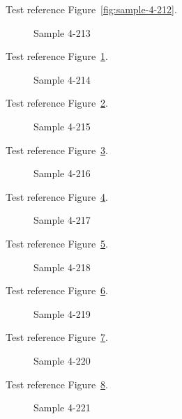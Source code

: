Test reference Figure~\ref{fig:sample-4-212}.

\begin{figure}[tbhp]
\caption{Sample 4-213}
\label{fig:sample-4-213}
\end{figure}

Test reference Figure~\ref{fig:sample-4-213}.

\begin{figure}[tbhp]
\caption{Sample 4-214}
\label{fig:sample-4-214}
\end{figure}

Test reference Figure~\ref{fig:sample-4-214}.

\begin{figure}[tbhp]
\caption{Sample 4-215}
\label{fig:sample-4-215}
\end{figure}

Test reference Figure~\ref{fig:sample-4-215}.

\begin{figure}[tbhp]
\caption{Sample 4-216}
\label{fig:sample-4-216}
\end{figure}

Test reference Figure~\ref{fig:sample-4-216}.

\begin{figure}[tbhp]
\caption{Sample 4-217}
\label{fig:sample-4-217}
\end{figure}

Test reference Figure~\ref{fig:sample-4-217}.

\begin{figure}[tbhp]
\caption{Sample 4-218}
\label{fig:sample-4-218}
\end{figure}

Test reference Figure~\ref{fig:sample-4-218}.

\begin{figure}[tbhp]
\caption{Sample 4-219}
\label{fig:sample-4-219}
\end{figure}

Test reference Figure~\ref{fig:sample-4-219}.

\begin{figure}[tbhp]
\caption{Sample 4-220}
\label{fig:sample-4-220}
\end{figure}

Test reference Figure~\ref{fig:sample-4-220}.

\begin{figure}[tbhp]
\caption{Sample 4-221}
\label{fig:sample-4-221}
\end{figure}

